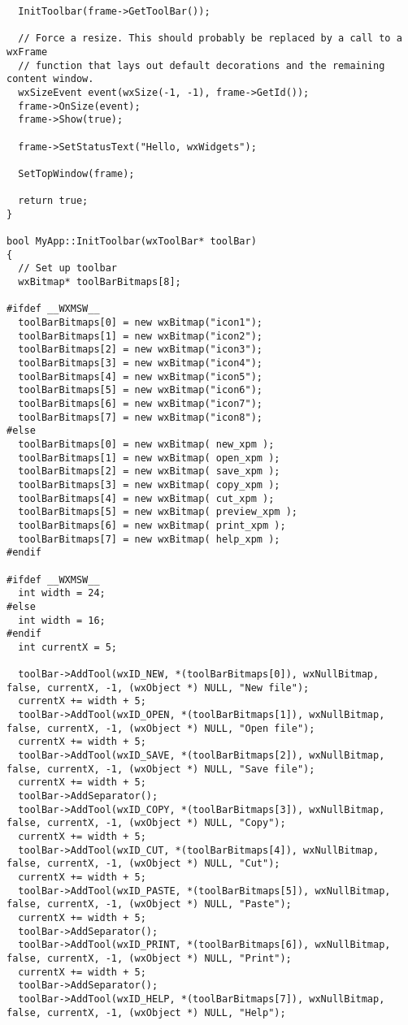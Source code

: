 {\begin{verbatim}
  InitToolbar(frame->GetToolBar());

  // Force a resize. This should probably be replaced by a call to a wxFrame
  // function that lays out default decorations and the remaining content window.
  wxSizeEvent event(wxSize(-1, -1), frame->GetId());
  frame->OnSize(event);
  frame->Show(true);

  frame->SetStatusText("Hello, wxWidgets");
  
  SetTopWindow(frame);

  return true;
}

bool MyApp::InitToolbar(wxToolBar* toolBar)
{
  // Set up toolbar
  wxBitmap* toolBarBitmaps[8];

#ifdef __WXMSW__
  toolBarBitmaps[0] = new wxBitmap("icon1");
  toolBarBitmaps[1] = new wxBitmap("icon2");
  toolBarBitmaps[2] = new wxBitmap("icon3");
  toolBarBitmaps[3] = new wxBitmap("icon4");
  toolBarBitmaps[4] = new wxBitmap("icon5");
  toolBarBitmaps[5] = new wxBitmap("icon6");
  toolBarBitmaps[6] = new wxBitmap("icon7");
  toolBarBitmaps[7] = new wxBitmap("icon8");
#else
  toolBarBitmaps[0] = new wxBitmap( new_xpm );
  toolBarBitmaps[1] = new wxBitmap( open_xpm );
  toolBarBitmaps[2] = new wxBitmap( save_xpm );
  toolBarBitmaps[3] = new wxBitmap( copy_xpm );
  toolBarBitmaps[4] = new wxBitmap( cut_xpm );
  toolBarBitmaps[5] = new wxBitmap( preview_xpm );
  toolBarBitmaps[6] = new wxBitmap( print_xpm );
  toolBarBitmaps[7] = new wxBitmap( help_xpm );
#endif

#ifdef __WXMSW__
  int width = 24;
#else
  int width = 16;
#endif
  int currentX = 5;

  toolBar->AddTool(wxID_NEW, *(toolBarBitmaps[0]), wxNullBitmap, false, currentX, -1, (wxObject *) NULL, "New file");
  currentX += width + 5;
  toolBar->AddTool(wxID_OPEN, *(toolBarBitmaps[1]), wxNullBitmap, false, currentX, -1, (wxObject *) NULL, "Open file");
  currentX += width + 5;
  toolBar->AddTool(wxID_SAVE, *(toolBarBitmaps[2]), wxNullBitmap, false, currentX, -1, (wxObject *) NULL, "Save file");
  currentX += width + 5;
  toolBar->AddSeparator();
  toolBar->AddTool(wxID_COPY, *(toolBarBitmaps[3]), wxNullBitmap, false, currentX, -1, (wxObject *) NULL, "Copy");
  currentX += width + 5;
  toolBar->AddTool(wxID_CUT, *(toolBarBitmaps[4]), wxNullBitmap, false, currentX, -1, (wxObject *) NULL, "Cut");
  currentX += width + 5;
  toolBar->AddTool(wxID_PASTE, *(toolBarBitmaps[5]), wxNullBitmap, false, currentX, -1, (wxObject *) NULL, "Paste");
  currentX += width + 5;
  toolBar->AddSeparator();
  toolBar->AddTool(wxID_PRINT, *(toolBarBitmaps[6]), wxNullBitmap, false, currentX, -1, (wxObject *) NULL, "Print");
  currentX += width + 5;
  toolBar->AddSeparator();
  toolBar->AddTool(wxID_HELP, *(toolBarBitmaps[7]), wxNullBitmap, false, currentX, -1, (wxObject *) NULL, "Help");


\end{verbatim}}
